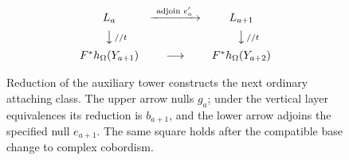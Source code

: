 \begin{figure}[htbp]
\centering
\[
\begin{array}{ccc}
 L_a & \xrightarrow{\ \text{adjoin }e'_a\ } & L_{a+1} \\[5pt]
 \big\downarrow\mathrlap{\scriptstyle\,//t} &&
 \big\downarrow\mathrlap{\scriptstyle\,//t} \\[5pt]
 F^*h_\Omega(Y_{a+1}) & \longrightarrow & F^*h_\Omega(Y_{a+2})
\end{array}
\]
\caption{Reduction of the auxiliary tower constructs the next ordinary
attaching class. The upper arrow nulls $g_a$; under the vertical layer
equivalences its reduction is $b_{a+1}$, and the lower arrow adjoins
the specified null $e_{a+1}$. The same square holds after the
compatible base change to complex cobordism.}
\label{fig:towers}
\end{figure}
